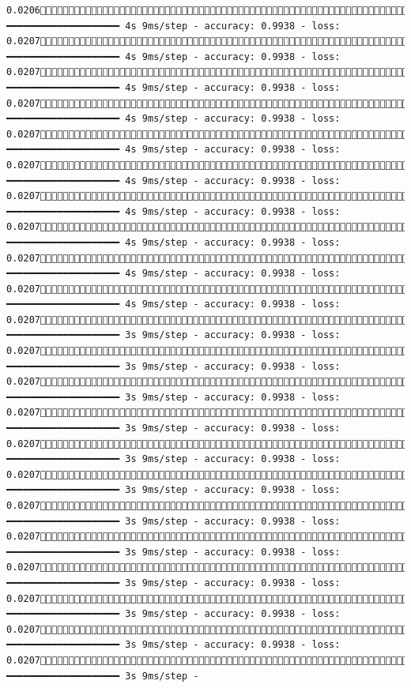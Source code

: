 \documentclass[
  letterpaper,
  DIV=11,
  numbers=noendperiod]{scrreprt}
\begin{document}
\begin{verbatim}
0.02061348/1875 ━━━━━━━━━━━━━━━━━━━━ 4s 9ms/step - accuracy: 0.9938 - loss: 0.02071355/1875 ━━━━━━━━━━━━━━━━━━━━ 4s 9ms/step - accuracy: 0.9938 - loss: 0.02071362/1875 ━━━━━━━━━━━━━━━━━━━━ 4s 9ms/step - accuracy: 0.9938 - loss: 0.02071369/1875 ━━━━━━━━━━━━━━━━━━━━ 4s 9ms/step - accuracy: 0.9938 - loss: 0.02071377/1875 ━━━━━━━━━━━━━━━━━━━━ 4s 9ms/step - accuracy: 0.9938 - loss: 0.02071384/1875 ━━━━━━━━━━━━━━━━━━━━ 4s 9ms/step - accuracy: 0.9938 - loss: 0.02071391/1875 ━━━━━━━━━━━━━━━━━━━━ 4s 9ms/step - accuracy: 0.9938 - loss: 0.02071398/1875 ━━━━━━━━━━━━━━━━━━━━ 4s 9ms/step - accuracy: 0.9938 - loss: 0.02071405/1875 ━━━━━━━━━━━━━━━━━━━━ 4s 9ms/step - accuracy: 0.9938 - loss: 0.02071412/1875 ━━━━━━━━━━━━━━━━━━━━ 4s 9ms/step - accuracy: 0.9938 - loss: 0.02071419/1875 ━━━━━━━━━━━━━━━━━━━━ 3s 9ms/step - accuracy: 0.9938 - loss: 0.02071426/1875 ━━━━━━━━━━━━━━━━━━━━ 3s 9ms/step - accuracy: 0.9938 - loss: 0.02071432/1875 ━━━━━━━━━━━━━━━━━━━━ 3s 9ms/step - accuracy: 0.9938 - loss: 0.02071439/1875 ━━━━━━━━━━━━━━━━━━━━ 3s 9ms/step - accuracy: 0.9938 - loss: 0.02071445/1875 ━━━━━━━━━━━━━━━━━━━━ 3s 9ms/step - accuracy: 0.9938 - loss: 0.02071452/1875 ━━━━━━━━━━━━━━━━━━━━ 3s 9ms/step - accuracy: 0.9938 - loss: 0.02071459/1875 ━━━━━━━━━━━━━━━━━━━━ 3s 9ms/step - accuracy: 0.9938 - loss: 0.02071466/1875 ━━━━━━━━━━━━━━━━━━━━ 3s 9ms/step - accuracy: 0.9938 - loss: 0.02071471/1875 ━━━━━━━━━━━━━━━━━━━━ 3s 9ms/step - accuracy: 0.9938 - loss: 0.02071477/1875 ━━━━━━━━━━━━━━━━━━━━ 3s 9ms/step - accuracy: 0.9938 - loss: 0.02071484/1875 ━━━━━━━━━━━━━━━━━━━━ 3s 9ms/step - accuracy: 0.9938 - loss: 0.02071491/1875 ━━━━━━━━━━━━━━━━━━━━ 3s 9ms/step - 
\end{verbatim}
\end{document}
